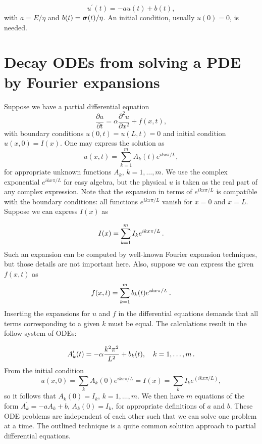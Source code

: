 \documentclass[%
oneside,                 %
final,                   %
10pt]{article}
\begin{document}
\begin{equation}
u^{\prime}(t) = -au(t) + b(t),
\end{equation}
with $a = E/\eta$ and $b(t)=\stress(t)/\eta$. An initial condition,
usually $u(0)=0$, is needed.




\section{Decay ODEs from solving a PDE by Fourier expansions}
\label{decay:app:diffusion:Fourier}


Suppose we have a partial differential equation
\[ \frac{\partial u}{\partial t} = \alpha\frac{\partial^2u}{\partial x^2}
+ f(x,t),
\]
with boundary conditions $u(0,t)=u(L,t)=0$ and initial condition
$u(x,0)=I(x)$. One may express the solution as
\[ u(x,t) = \sum_{k=1}^m A_k(t)e^{ikx\pi/L},\]
for appropriate unknown functions $A_k$, $k=1,\ldots,m$.
We use the complex exponential $e^{ikx\pi/L}$ for easy algebra, but
the physical $u$ is taken as the real part of any complex expression.
Note that the expansion in terms of $e^{ikx\pi/L}$ is compatible with
the boundary conditions: all functions $e^{ikx\pi/L}$ vanish for
$x=0$ and $x=L$. Suppose we can express $I(x)$ as

\[ I(x) = \sum_{k=1}^m I_ke^{ikx\pi/L}
\tp
\]
Such an expansion can be computed by well-known Fourier expansion techniques,
but those details are not important here.
Also, suppose we can express the given $f(x,t)$ as
\[ f(x,t) = \sum_{k=1}^m b_k(t)e^{ikx\pi/L}
\tp
\]
Inserting the expansions for $u$
and $f$ in the differential equations demands that all terms corresponding
to a given $k$ must be equal. The calculations result in the follow
system of ODEs:

\[
A_k^{\prime}(t) = -\alpha\frac{k^2\pi^2}{L^2} + b_k(t),\quad k=1,\ldots,m
\tp
\]
From the initial condition
\[ u(x,0)=\sum_k A_k(0)e^{ikx\pi/L}=I(x)=\sum_k I_k e^{(ikx\pi/L)},\]
so it follows that $A_k(0)=I_k$, $k=1,\ldots,m$. We then have $m$
equations of the form $A_k^{\prime}=-a A_k +b$, $A_k(0)=I_k$, for
appropriate definitions of $a$ and $b$. These ODE problems
are independent of each other such that we can solve one problem
at a time. The outlined technique is a quite common solution approach to
partial differential equations.
\end{document}
